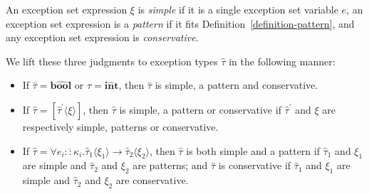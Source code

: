 \documentclass{llncs}
\newcommand{\Throws}[2]{#1\langle #2\rangle}    %
\newcommand{\ExnTy}{\widehat\tau}
\newcommand{\ExnTyBool}{\mathrm{b\widehat{oo}l}}    %
\newcommand{\ExnTyArr}[4]{\Throws{#1}{#2} \to \Throws{#3}{#4}}
\newcommand{\Exn}{\xi}
\newcommand{\ExnVar}{e}
\newcommand{\ExnBool}{\mathbf{b\widehat{oo}l}}      %
\newcommand{\ExnInt}{\mathbf{i\widehat{n}t}}        %
\begin{document}
\begin{definition}
An exception set expression $\Exn$ is \emph{simple} if it is a single exception set variable $\ExnVar$, an exception set expression is a \emph{pattern} if it fits Definition~\ref{definition-pattern}, and any exception set expression is \emph{conservative}.

We lift these three judgments to exception types $\ExnTy$ in the following manner:

    \begin{itemize}
    
        \item If $\ExnTy = \ExnBool$ or $\ExnTy = \ExnInt$, then $\ExnTy$ is simple, a pattern and conservative.
        
        \item If $\ExnTy = [\Throws{\ExnTy^\prime}{\Exn}]$, then $\ExnTy$ is simple, a pattern or conservative if $\ExnTy^\prime$ and $\Exn$ are respectively simple, patterns  or conservative.
        
        \item If $\ExnTy = \forall \overline{\ExnVar_i :: \kappa_i}.\ExnTyArr{\ExnTy_1}{\Exn_1}{\ExnTy_2}{\Exn_2}$, then $\ExnTy$ is both simple and a pattern if $\ExnTy_1$ and $\Exn_1$ are simple and $\ExnTy_2$ and $\Exn_2$ are patterns; and $\ExnTy$ is conservative if $\ExnTy_1$ and $\Exn_1$ are simple and $\ExnTy_2$ and $\Exn_2$ are conservative.
    
    \end{itemize}
\end{definition}
\end{document}
